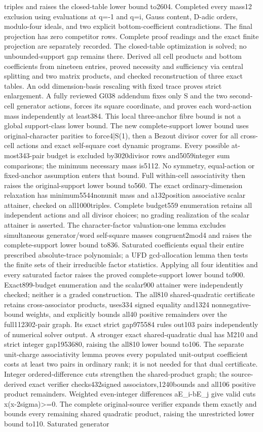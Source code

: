 triples and raises the closed-table lower bound to2604. Completed every mass12 exclusion using evaluations at q=-1 and q=i, Gauss content, D-adic orders, modulo-four ideals, and two explicit bottom-coefficient contradictions. The final projection has zero competitor rows. Complete proof readings and the exact finite projection are separately recorded. The closed-table optimization is solved; no unbounded-support gap remains there. Derived all cell products and bottom coefficients from nineteen entries, proved necessity and sufficiency via central splitting and two matrix products, and checked reconstruction of three exact tables. An odd dimension-basis rescaling with fixed trace proves strict enlargement. A fully reviewed G038 addendum fixes only S and the two second-cell generator actions, forces its square coordinate, and proves each word-action mass independently at least384. This local three-anchor fibre bound is not a global support-class lower bound. The new complete-support lower bound uses original-character parities to force4|S(1), then a Bezout divisor cover for all cross-cell actions and exact self-square cost dynamic programs. Every possible at-most343-pair budget is excluded by3020divisor rows and5059integer sum comparisons; the minimum necessary mass is5112. No symmetry, equal-action or fixed-anchor assumption enters that bound. Full within-cell associativity then raises the original-support lower bound to560. The exact ordinary-dimension relaxation has minimum5544nonunit mass and a132position associative scalar attainer, checked on all1000triples. Complete budget559 enumeration retains all independent actions and all divisor choices; no grading realization of the scalar attainer is asserted. The character-factor valuation-one lemma excludes simultaneous generator/word self-square masses congruent2mod4 and raises the complete-support lower bound to836. Saturated coefficients equal their entire prescribed absolute-trace polynomials; a UFD gcd-allocation lemma then tests the finite sets of their irreducible factor statistics. Applying all four identities and every saturated factor raises the proved complete-support lower bound to900. Exact899-budget enumeration and the scalar900 attainer were independently checked; neither is a graded construction. The all810 shared-quadratic certificate retains cross-associator products, uses334 signed equality and1324 nonnegative-bound weights, and explicitly bounds all40 positive remainders over the full112302-pair graph. Its exact strict gap975584 rules out103 pairs independently of numerical solver output. A stronger exact shared-quadratic dual has M210 and strict integer gap1953680, raising the all810 lower bound to106. The separate unit-charge associativity lemma proves every populated unit-output coefficient costs at least two pairs in ordinary rank; it is not needed for that dual certificate. Integer ordered-difference cuts strengthen the shared-product graph; the source-derived exact verifier checks432signed associators,1240bounds and all106 positive product remainders. Weighted even-integer differences aE\_i-bE\_j give valid cuts x(x-2sigma)>=0. The complete original-source verifier expands them exactly and bounds every remaining shared quadratic product, raising the unrestricted lower bound to110. Saturated generator 